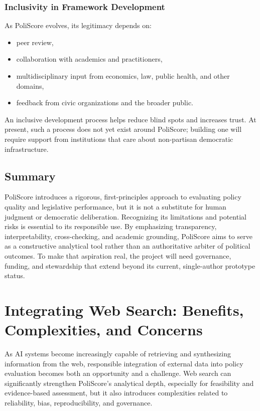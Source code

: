 \documentclass[12pt]{article}
\begin{document}
\subsubsection{Inclusivity in Framework Development}

As PoliScore evolves, its legitimacy depends on:

\begin{itemize}
    \item peer review,
    \item collaboration with academics and practitioners,
    \item multidisciplinary input from economics, law, public health, and other domains,
    \item feedback from civic organizations and the broader public.
\end{itemize}

An inclusive development process helps reduce blind spots and increases trust. At present, such a process does not yet
exist around PoliScore; building one will require support from institutions that care about non-partisan democratic
infrastructure.

\subsection*{Summary}

PoliScore introduces a rigorous, first-principles approach to evaluating policy quality and legislative performance, but it
is not a substitute for human judgment or democratic deliberation. Recognizing its limitations and potential risks is
essential to its responsible use. By emphasizing transparency, interpretability, cross-checking, and academic grounding,
PoliScore aims to serve as a constructive analytical tool rather than an authoritative arbiter of political outcomes. To
make that aspiration real, the project will need governance, funding, and stewardship that extend beyond its current,
single-author prototype status.


\section{Integrating Web Search: Benefits, Complexities, and Concerns}
\label{sec:web}

As AI systems become increasingly capable of retrieving and synthesizing information from the web, responsible integration
of external data into policy evaluation becomes both an opportunity and a challenge. Web search can significantly
strengthen PoliScore's analytical depth, especially for feasibility and evidence-based assessment, but it also introduces
complexities related to reliability, bias, reproducibility, and governance.
\end{document}
